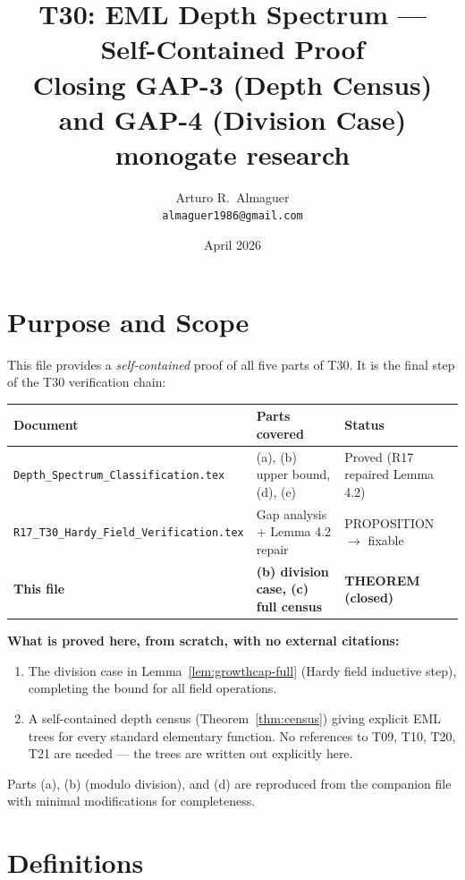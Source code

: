 \documentclass[12pt,a4paper]{article}
\title{T30: EML Depth Spectrum --- Self-Contained Proof\\
       \large Closing GAP-3 (Depth Census) and GAP-4 (Division Case)\\
       \normalsize monogate research}
\author{Arturo R.\ Almaguer\\
\small \texttt{almaguer1986@gmail.com}}
\date{April 2026}
\theoremstyle{definition}
\theoremstyle{remark}
\begin{document}
\maketitle
\tableofcontents

\section{Purpose and Scope}

This file provides a \emph{self-contained} proof of all five parts of T30.
It is the final step of the T30 verification chain:

\begin{center}
\begin{tabular}{@{}lll@{}}
\toprule
\textbf{Document} & \textbf{Parts covered} & \textbf{Status} \\
\midrule
\texttt{Depth\_Spectrum\_Classification.tex}
  & (a), (b) upper bound, (d), (e)
  & Proved (R17 repaired Lemma 4.2) \\
\texttt{R17\_T30\_Hardy\_Field\_Verification.tex}
  & Gap analysis + Lemma 4.2 repair
  & PROPOSITION $\to$ fixable \\
\textbf{This file}
  & \textbf{(b) division case, (c) full census}
  & \textbf{THEOREM (closed)} \\
\bottomrule
\end{tabular}
\end{center}

\noindent\textbf{What is proved here, from scratch, with no external citations:}
\begin{enumerate}
  \item[\textbf{GAP-4}] The division case in Lemma~\ref{lem:growthcap-full}
        (Hardy field inductive step), completing the bound for all field operations.
  \item[\textbf{GAP-3}] A self-contained depth census (Theorem~\ref{thm:census})
        giving explicit EML trees for every standard elementary function.
        No references to T09, T10, T20, T21 are needed --- the trees are written
        out explicitly here.
\end{enumerate}

Parts (a), (b) (modulo division), and (d) are reproduced from the companion
file with minimal modifications for completeness.

\section{Definitions}
\end{document}
